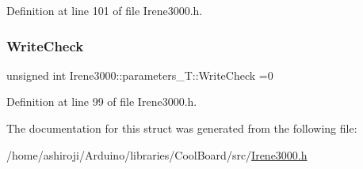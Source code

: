 Definition at line 101 of file Irene3000.\+h.

\mbox{\label{struct_irene3000_1_1parameters___t_a56f1f14d33a69300d580eda2dc52cecd}} 
\subsubsection{\texorpdfstring{Write\+Check}{WriteCheck}}
{\footnotesize\ttfamily unsigned int Irene3000\+::parameters\+\_\+\+T\+::\+Write\+Check =0}



Definition at line 99 of file Irene3000.\+h.



The documentation for this struct was generated from the following file\+:\begin{DoxyCompactItemize}
\item 
/home/ashiroji/\+Arduino/libraries/\+Cool\+Board/src/\hyperlink{_irene3000_8h}{Irene3000.\+h}\end{DoxyCompactItemize}
